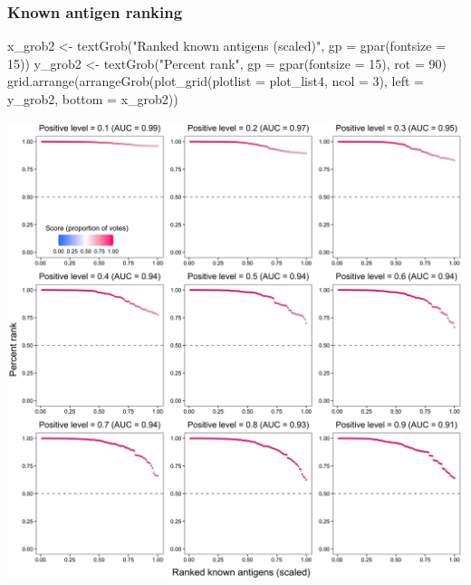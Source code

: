 \documentclass[
  11pt,
  oneside]{book}
\newenvironment{Shaded}{\begin{snugshade}}{\end{snugshade}}
\newcommand{\AttributeTok}[1]{\textcolor[rgb]{0.77,0.63,0.00}{#1}}
\newcommand{\DecValTok}[1]{\textcolor[rgb]{0.00,0.00,0.81}{#1}}
\newcommand{\FunctionTok}[1]{\textcolor[rgb]{0.00,0.00,0.00}{#1}}
\newcommand{\NormalTok}[1]{#1}
\newcommand{\OtherTok}[1]{\textcolor[rgb]{0.56,0.35,0.01}{#1}}
\newcommand{\StringTok}[1]{\textcolor[rgb]{0.31,0.60,0.02}{#1}}
\begin{document}
\hypertarget{known-antigen-ranking-1}{%
\subsubsection{Known antigen ranking}\label{known-antigen-ranking-1}}

\begin{Shaded}
\begin{Highlighting}[]
\NormalTok{x\_grob2 }\OtherTok{\textless{}{-}} \FunctionTok{textGrob}\NormalTok{(}\StringTok{"Ranked known antigens (scaled)"}\NormalTok{, }\AttributeTok{gp =} \FunctionTok{gpar}\NormalTok{(}\AttributeTok{fontsize =} \DecValTok{15}\NormalTok{))}
\NormalTok{y\_grob2 }\OtherTok{\textless{}{-}} \FunctionTok{textGrob}\NormalTok{(}\StringTok{"Percent rank"}\NormalTok{, }\AttributeTok{gp =} \FunctionTok{gpar}\NormalTok{(}\AttributeTok{fontsize =} \DecValTok{15}\NormalTok{), }\AttributeTok{rot =} \DecValTok{90}\NormalTok{)}
\FunctionTok{grid.arrange}\NormalTok{(}\FunctionTok{arrangeGrob}\NormalTok{(}\FunctionTok{plot\_grid}\NormalTok{(}\AttributeTok{plotlist =}\NormalTok{ plot\_list4, }\AttributeTok{ncol =} \DecValTok{3}\NormalTok{), }\AttributeTok{left =}\NormalTok{ y\_grob2, }\AttributeTok{bottom =}\NormalTok{ x\_grob2))}
\end{Highlighting}
\end{Shaded}

\begin{center}\includegraphics[width=1\linewidth]{./figures/Supplementary Fig 4} \end{center}
\end{document}
